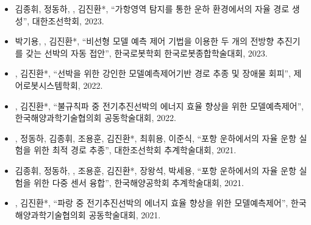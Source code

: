 \documentclass[10pt, letterpaper]{article}
\begin{document}
\begin{itemize}
            \vspace{0.2 cm}
        
        \item 김종휘, 정동하, , 김진환*, “가항영역 탐지를 통한 운하 환경에서의 자율 경로 생성”, 대한조선학회, 2023.
            
            \vspace{0.2 cm}
        
        \item 박기용, , 김진환*, “비선형 모델 예측 제어 기법을 이용한 두 개의 전방향 추진기를 갖는 선박의 자동 접안”, 한국로봇학회 한국로봇종합학술대회, 2023.
            
            \vspace{0.2 cm}
        
        \item {}, 김진환*, “선박을 위한 강인한 모델예측제어기반 경로 추종 및 장애물 회피”, 제어로봇시스템학회, 2022.
            
            \vspace{0.2 cm}
        
        \item {}, 김진환*, “불규칙파 중 전기추진선박의 에너지 효율 향상을 위한 모델예측제어”, 한국해양과학기술협의회 공동학술대회, 2022.
            
            \vspace{0.2 cm}
        
        \item {}, 정동하, 김종휘, 조용훈, 김진환*, 최휘용, 이준식, “포항 운하에서의 자율 운항 실험을 위한 최적 경로 추종”, 대한조선학회 추계학술대회, 2021.
            
            \vspace{0.2 cm}
        
        \item 김종휘, 정동하, , 조용훈, 김진환*, 장왕석, 박세용, “포항 운하에서의 자율 운항 실험을 위한 다중 센서 융합”, 한국해양공학회 추계학술대회, 2021.
            
            \vspace{0.2 cm}
        
        \item {}, 김진환*, “파랑 중 전기추진선박의 에너지 효율 향상을 위한 모델예측제어”, 한국해양과학기술협의회 공동학술대회, 2021.
            
            \vspace{0.2 cm}
        

\end{itemize}
\end{document}
